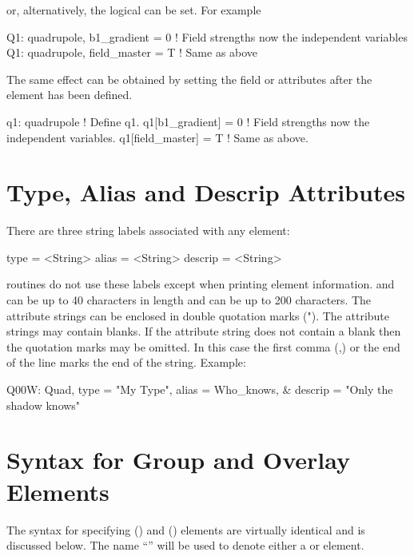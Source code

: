or, alternatively, the  logical can be set. For
example
\begin{example}
  Q1: quadrupole, b1_gradient = 0   ! Field strengths now the independent variables
  Q1: quadrupole, field_master = T  ! Same as above
\end{example}
The same effect can be obtained by setting the field or  attributes
after the element has been defined.
\begin{example}
  q1: quadrupole        ! Define q1.
  q1[b1_gradient] = 0   ! Field strengths now the independent variables.
  q1[field_master] = T  ! Same as above.
\end{example}

\section{Type, Alias and Descrip Attributes}
\label{s:alias}

There are three string labels associated with any element:
\begin{example}
  type    = <String>
  alias   = <String>
  descrip = <String>
\end{example}
\bmad routines do not use these labels except when printing element
information.  and  can be up to 40 characters in
length and  can be up to 200 characters. The attribute
strings can be enclosed in double quotation marks ("). The attribute
strings may contain blanks. If the attribute string does not contain a
blank then the quotation marks may be omitted. In this case the first
comma (,) or the end of the line marks the end of the string. Example:
\begin{example}
  Q00W: Quad, type = "My Type", alias = Who_knows, &
                                  descrip = "Only the shadow knows"
\end{example}

\section{Syntax for Group and Overlay Elements}
\label{s:go.syntax}

The syntax for specifying  () and 
() elements are virtually identical and is discussed
below. The name ``'' will be used to denote either a
 or  element.

